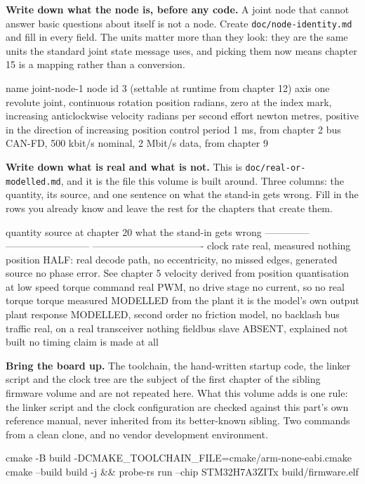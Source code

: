 \begin{steps}
\item \textbf{Write down what the node is, before any code.} A joint node that
cannot answer basic questions about itself is not a node. Create
\texttt{doc/node-identity.md} and fill in every field. The units matter more
than they look: they are the same units the standard joint state message uses,
and picking them now means chapter 15 is a mapping rather than a conversion.
\begin{plaincode}
name           joint-node-1
node id        3            (settable at runtime from chapter 12)
axis           one revolute joint, continuous rotation
position       radians, zero at the index mark, increasing anticlockwise
velocity       radians per second
effort         newton metres, positive in the direction of increasing position
control period 1 ms, from chapter 2
bus            CAN-FD, 500 kbit/s nominal, 2 Mbit/s data, from chapter 9
\end{plaincode}

\item \textbf{Write down what is real and what is not.} This is
\texttt{doc/real-or-modelled.md}, and it is the file this volume is built
around. Three columns: the quantity, its source, and one sentence on what the
stand-in gets wrong. Fill in the rows you already know and leave the rest for
the chapters that create them.
\begin{plaincode}
quantity        source at chapter 20        what the stand-in gets wrong
--------------  --------------------------  ----------------------------------
clock rate      real, measured              nothing
position        HALF: real decode path,     no eccentricity, no missed edges,
                generated source            no phase error. See chapter 5
velocity        derived from position       quantisation at low speed
torque command  real PWM, no drive stage    no current, so no real torque
torque measured MODELLED from the plant     it is the model's own output
plant response  MODELLED, second order      no friction model, no backlash
bus traffic     real, on a real transceiver nothing
fieldbus slave  ABSENT, explained not built no timing claim is made at all
\end{plaincode}

\item \textbf{Bring the board up.} The toolchain, the hand-written startup code,
the linker script and the clock tree are the subject of the first chapter of the
sibling firmware volume and are not repeated here. What this volume adds is one
rule: the linker script and the clock configuration are checked against this
part's own reference manual, never inherited from its better-known sibling. Two
commands from a clean clone, and no vendor development environment.
\begin{shellcode}
cmake -B build -DCMAKE_TOOLCHAIN_FILE=cmake/arm-none-eabi.cmake
cmake --build build -j && probe-rs run --chip STM32H7A3ZITx build/firmware.elf
\end{shellcode}


\end{steps}
